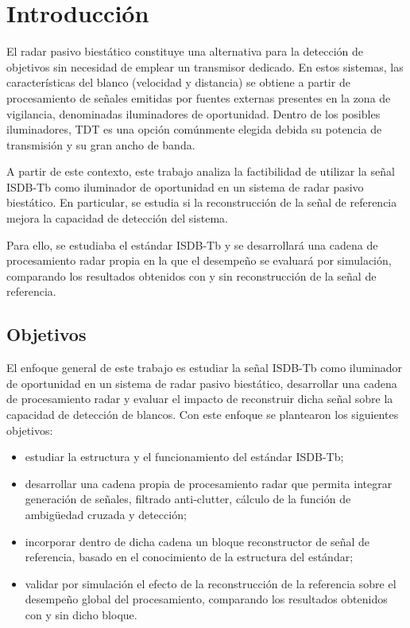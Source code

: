 \chapter{Introducción}

El radar pasivo biestático constituye una alternativa para la detección de objetivos sin necesidad de emplear un transmisor dedicado. En estos sistemas, las características del blanco (velocidad y distancia) se obtiene a partir de procesamiento de señales emitidas por fuentes externas  presentes en la zona de vigilancia, denominadas iluminadores de oportunidad. Dentro de los posibles iluminadores, TDT es una opción comúnmente elegida debida su potencia de transmisión y su gran ancho de banda.



A partir de este contexto, este trabajo analiza la factibilidad de utilizar la señal ISDB-Tb como iluminador de oportunidad en un sistema de radar pasivo biestático. En particular, se estudia si la reconstrucción de la señal de referencia  mejora la capacidad de detección del sistema.


Para ello, se estudiaba el estándar ISDB-Tb  y se desarrollará una cadena de procesamiento radar propia en la que el desempeño se evaluará por simulación, comparando los resultados obtenidos con y sin reconstrucción de la señal de referencia.

\section{Objetivos}

El enfoque general de este trabajo es estudiar la señal ISDB-Tb como iluminador de oportunidad en un sistema de radar pasivo biestático, desarrollar una cadena de procesamiento radar y evaluar el impacto de reconstruir dicha señal sobre la capacidad de detección de blancos. Con este enfoque se plantearon los siguientes objetivos:


\begin{itemize}
    \item estudiar la estructura y el funcionamiento del estándar ISDB-Tb;
    \item desarrollar una cadena propia de procesamiento radar que permita integrar generación de señales, filtrado anti-clutter, cálculo de la función de ambigüedad cruzada y detección;
    \item incorporar dentro de dicha cadena un bloque reconstructor de señal de referencia, basado en el conocimiento de la estructura del estándar;
    \item validar por simulación el efecto de la reconstrucción de la referencia sobre el desempeño global del procesamiento, comparando los resultados obtenidos con y sin dicho bloque.
\end{itemize}

